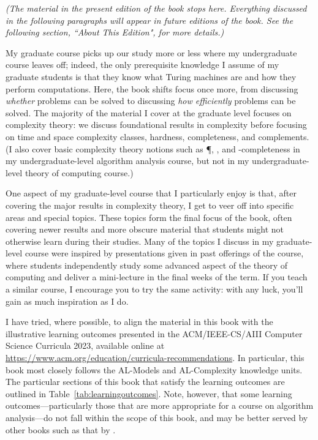 
\textsl{(The material in the present edition of the book stops here. Everything discussed in the following paragraphs will appear in future editions of the book. See the following section, ``About This Edition", for more details.)}


My graduate course picks up our study more or less where my undergraduate course leaves off; indeed, the only prerequisite knowledge I assume of my graduate students is that they know what Turing machines are and how they perform computations. Here, the book shifts focus once more, from discussing \emph{whether} problems can be solved to discussing \emph{how efficiently} problems can be solved. The majority of the material I cover at the graduate level focuses on complexity theory: we discuss foundational results in complexity before focusing on time and space complexity classes, hardness, completeness, and complements. (I also cover basic complexity theory notions such as \P, \NP, and \NP-completeness in my undergraduate-level algorithm analysis course, but not in my undergraduate-level theory of computing course.)

One aspect of my graduate-level course that I particularly enjoy is that, after covering the major results in complexity theory, I get to veer off into specific areas and special topics. These topics form the final focus of the book, often covering newer results and more obscure material that students might not otherwise learn during their studies. Many of the topics I discuss in my graduate-level course were inspired by presentations given in past offerings of the course, where students independently study some advanced aspect of the theory of computing and deliver a mini-lecture in the final weeks of the term. If you teach a similar course, I encourage you to try the same activity: with any luck, you'll gain as much inspiration as I do.

I have tried, where possible, to align the material in this book with the illustrative learning outcomes presented in the ACM/IEEE-CS/AIII Computer Science Curricula 2023, available online at \url{https://www.acm.org/education/curricula-recommendations}. In particular, this book most closely follows the AL-Models and AL-Complexity knowledge units. The particular sections of this book that satisfy the learning outcomes are outlined in Table~\ref{tab:learningoutcomes}. Note, however, that some learning outcomes---particularly those that are more appropriate for a course on algorithm analysis---do not fall within the scope of this book, and may be better served by other books such as that by \citet{Erickson2019Algorithms}.

